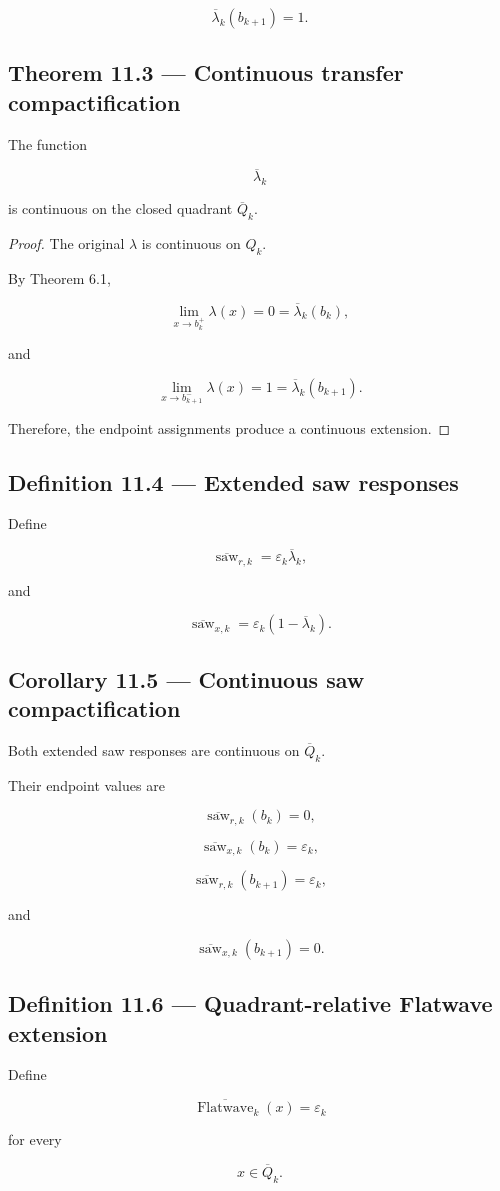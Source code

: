 \documentclass[11pt,oneside,openany]{book}
\newcommand{\PCsubsection}[1]{%
  \subsection*{#1}%
}
\begin{document}
\[
\overline\lambda_k(b_{k+1})=1.
\]

\PCsubsection{Theorem 11.3 --- Continuous transfer compactification}

The function

\[
\overline\lambda_k
\]

is continuous on the closed quadrant \(\overline Q_k\).

\begin{proof}
The original \(\lambda\) is continuous on \(Q_k\).

By Theorem 6.1,

\[
\lim_{x\to b_k^+}\lambda(x)=0 = \overline\lambda_k(b_k),
\]

and

\[
\lim_{x\to b_{k+1}^-}\lambda(x)=1 = \overline\lambda_k(b_{k+1}).
\]

Therefore, the endpoint assignments produce a continuous extension.

\end{proof}

\PCsubsection{Definition 11.4 --- Extended saw responses}

Define

\[
\overline{\operatorname{saw}}_{r,k} = \varepsilon_k\overline\lambda_k,
\]

and

\[
\overline{\operatorname{saw}}_{x,k} = \varepsilon_k(1-\overline\lambda_k).
\]

\PCsubsection{Corollary 11.5 --- Continuous saw compactification}

Both extended saw responses are continuous on \(\overline Q_k\).

Their endpoint values are

\[
\overline{\operatorname{saw}}_{r,k}(b_k)=0,
\]

\[
\overline{\operatorname{saw}}_{x,k}(b_k)=\varepsilon_k,
\]

\[
\overline{\operatorname{saw}}_{r,k}(b_{k+1})=\varepsilon_k,
\]

and

\[
\overline{\operatorname{saw}}_{x,k}(b_{k+1})=0.
\]

\PCsubsection{Definition 11.6 --- Quadrant-relative Flatwave extension}

Define

\[
\overline{\operatorname{Flatwave}}_k(x)=\varepsilon_k
\]

for every

\[
x\in\overline Q_k.
\]
\end{document}
